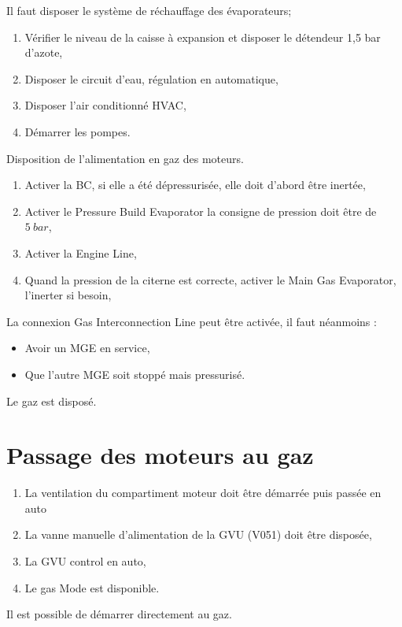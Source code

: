 \documentclass[12pt,a4paper]{article}
\begin{document}
Il faut disposer le système de réchauffage des évaporateurs;
\begin{enumerate}
 \item Vérifier le niveau de la caisse à expansion et disposer le détendeur 1,5 bar d'azote,
 \item Disposer le circuit d'eau, régulation en automatique,
 \item Disposer l'air conditionné HVAC,
 \item Démarrer les pompes.
\end{enumerate}
Disposition de l'alimentation en gaz des moteurs.
\begin{enumerate}[resume]
 \item Activer la BC, si elle a été dépressurisée, elle doit d'abord être inertée,
 \item Activer le Pressure Build Evaporator la consigne de pression doit être de $5~bar$,
 \item Activer la Engine Line,
 \item Quand la pression de la citerne est correcte, activer le Main Gas Evaporator, l'inerter si besoin,
 \end{enumerate}
La connexion Gas Interconnection Line peut être activée, il faut néanmoins :
\begin{itemize}
 \item Avoir un MGE en service,
 \item Que l'autre MGE soit stoppé mais pressurisé.
\end{itemize}
Le gaz est disposé.
\section*{Passage des moteurs au gaz}
\begin{enumerate}
 \item La ventilation du compartiment moteur doit être démarrée puis passée en auto 
 \item La vanne manuelle d'alimentation de la GVU (V051) doit être disposée,
 \item La GVU control en auto,
 \item Le gas Mode est disponible.
\end{enumerate}
Il est possible de démarrer directement au gaz.
\newpage
%
%
\end{document}
